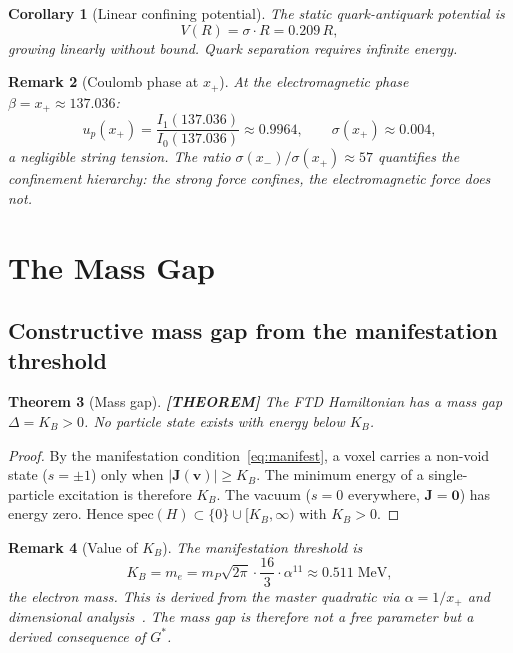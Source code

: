 \documentclass[11pt]{article}
\theoremstyle{tight}
\newtheorem{theorem}{Theorem}[section]
\newtheorem{corollary}[theorem]{Corollary}
\theoremstyle{plainroman}
\newtheorem{remark}[theorem]{Remark}
\begin{document}
\begin{corollary}[Linear confining potential]\label{cor:linear}
The static quark-antiquark potential is
\[
V(R)=\sigma\cdot R=0.209\,R,
\]
growing linearly without bound.
Quark separation requires infinite energy.
\end{corollary}

\begin{remark}[Coulomb phase at $x_+$]
At the electromagnetic phase $\beta=x_+\approx 137.036$:
\[
u_p(x_+)=\frac{I_1(137.036)}{I_0(137.036)}\approx 0.9964, \qquad \sigma(x_+)\approx 0.004,
\]
a negligible string tension.
The ratio $\sigma(x_-)/\sigma(x_+)\approx 57$ quantifies the confinement hierarchy: the strong force confines, the electromagnetic force does not.
\end{remark}

\section{The Mass Gap}

\subsection{Constructive mass gap from the manifestation threshold}

\begin{theorem}[Mass gap]\label{thm:massgap}
\textbf{[THEOREM]}
The FTD Hamiltonian has a mass gap $\Delta=K_B>0$.
No particle state exists with energy below $K_B$.
\end{theorem}
\begin{proof}
By the manifestation condition~\eqref{eq:manifest}, a voxel carries a non-void state ($s=\pm 1$) only when $|\mathbf J(\mathbf v)|\ge K_B$.
The minimum energy of a single-particle excitation is therefore $K_B$.
The vacuum ($s=0$ everywhere, $\mathbf J=\mathbf 0$) has energy zero.
Hence $\mathrm{spec}(H)\subset\{0\}\cup[K_B,\infty)$ with $K_B>0$.
\end{proof}

\begin{remark}[Value of $K_B$]
The manifestation threshold is
\[
K_B=m_e=m_P\sqrt{2\pi}\cdot\frac{16}{3}\cdot\alpha^{11}\approx 0.511\;\text{MeV},
\]
the electron mass.
This is derived from the master quadratic via $\alpha=1/x_+$ and dimensional analysis~\cite{ftdspec}.
The mass gap is therefore not a free parameter but a derived consequence of $G^*$.
\end{remark}
\end{document}
